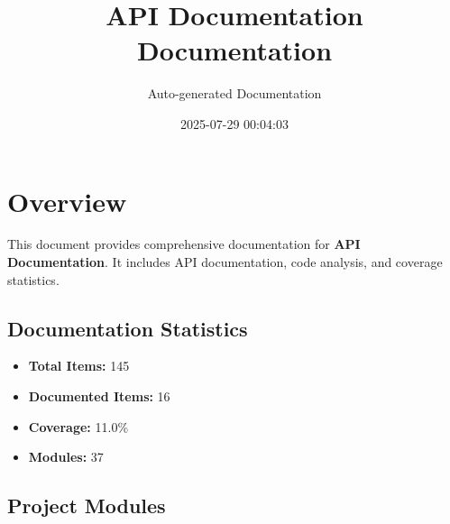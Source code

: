 \documentclass[11pt,a4paper]{article}
\title{API Documentation\\Documentation}
\author{Auto-generated Documentation}
\date{2025-07-29 00:04:03}
\begin{document}
\maketitle
\thispagestyle{empty}

\newpage
\tableofcontents
\newpage

\section{Overview}

This document provides comprehensive documentation for \textbf{API Documentation}. It includes API documentation, code analysis, and coverage statistics.

\subsection{Documentation Statistics}

\begin{itemize}
    \item \textbf{Total Items:} 145
    \item \textbf{Documented Items:} 16
    \item \textbf{Coverage:} 11.0\%
    \item \textbf{Modules:} 37
\end{itemize}

\subsection{Project Modules}
\end{document}
